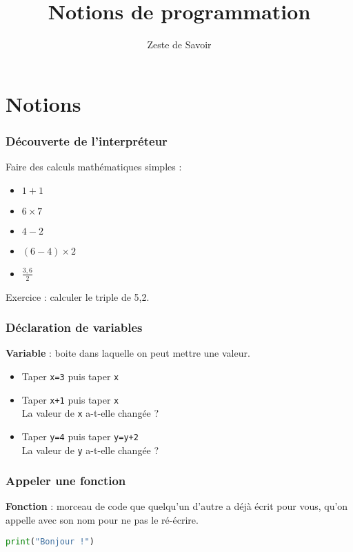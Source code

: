 \documentclass{beamer}
\title{Notions de programmation}
\author{Zeste de Savoir}
\begin{document}
\begin{frame}
  \titlepage
\end{frame}

\section{Notions}

\begin{frame}
    \frametitle{Découverte de l'interpréteur}
    Faire des calculs mathématiques simples :
    \begin{itemize}
    \item \(1+1\)
    \item \(6\times 7\)
    \item \(4-2\)
    \item \((6-4)\times 2\)
    \item \(\frac{ 3,6 }{ 2 }\)
    \end{itemize}

    Exercice : calculer le triple de 5,2.
\end{frame}

\begin{frame}
    \frametitle{Déclaration de variables}
    \textbf{Variable} : boite dans laquelle on peut mettre une valeur.
    \begin{itemize}
        \item Taper \texttt{x=3} puis taper \texttt{x}
        \item Taper \texttt{x+1} puis taper \texttt{x}
        \\ La valeur de \texttt{x} a-t-elle changée ?
        \item Taper \texttt{y=4} puis taper \texttt{y=y+2}
        \\ La valeur de \texttt{y} a-t-elle changée ?
    \end{itemize}
\end{frame}

\begin{frame}[fragile]
    \frametitle{Appeler une fonction}
    \textbf{Fonction} : morceau de code que quelqu'un d'autre a déjà écrit pour vous, qu'on appelle avec son nom pour ne pas le ré-écrire.
    \medbreak
    \begin{lstlisting}[language=python]
    print("Bonjour !")
    \end{lstlisting}
\end{frame}
\end{document}
